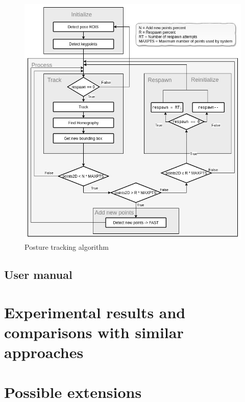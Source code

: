\begin{figure}
	\centerline{\includegraphics[scale=0.5]{fig/posture-tracking-algorithm.jpg}}  
	\caption{Posture tracking algorithm}
\end{figure}
\subsection{User manual}

\section{Experimental results and comparisons with similar approaches}
\section{Possible extensions}